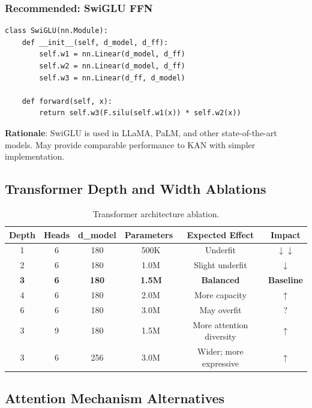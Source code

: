 \documentclass[11pt,a4paper]{article}
\begin{document}
\subsubsection{Recommended: SwiGLU FFN}

\begin{verbatim}
class SwiGLU(nn.Module):
    def __init__(self, d_model, d_ff):
        self.w1 = nn.Linear(d_model, d_ff)
        self.w2 = nn.Linear(d_model, d_ff)
        self.w3 = nn.Linear(d_ff, d_model)
    
    def forward(self, x):
        return self.w3(F.silu(self.w1(x)) * self.w2(x))
\end{verbatim}

\textbf{Rationale}: SwiGLU is used in LLaMA, PaLM, and other state-of-the-art models. May provide comparable performance to KAN with simpler implementation.

\subsection{Transformer Depth and Width Ablations}

\begin{table}[H]
\centering
\begin{tabular}{cccccc}
\toprule
\textbf{Depth} & \textbf{Heads} & \textbf{d\_model} & \textbf{Parameters} & \textbf{Expected Effect} & \textbf{Impact} \\
\midrule
1 & 6 & 180 & ~500K & Underfit & \textcolor{negative}{$\downarrow\downarrow$} \\
2 & 6 & 180 & ~1.0M & Slight underfit & \textcolor{negative}{$\downarrow$} \\
\rowcolor{lightgray}
\textbf{3} & \textbf{6} & \textbf{180} & \textbf{~1.5M} & \textbf{Balanced} & \textbf{Baseline} \\
4 & 6 & 180 & ~2.0M & More capacity & \textcolor{positive}{$\uparrow$} \\
6 & 6 & 180 & ~3.0M & May overfit & \textcolor{uncertain}{$?$} \\
3 & 9 & 180 & ~1.5M & More attention diversity & \textcolor{positive}{$\uparrow$} \\
3 & 6 & 256 & ~3.0M & Wider; more expressive & \textcolor{positive}{$\uparrow$} \\
\bottomrule
\end{tabular}
\caption{Transformer architecture ablation.}
\end{table}

\subsection{Attention Mechanism Alternatives}
\end{document}
